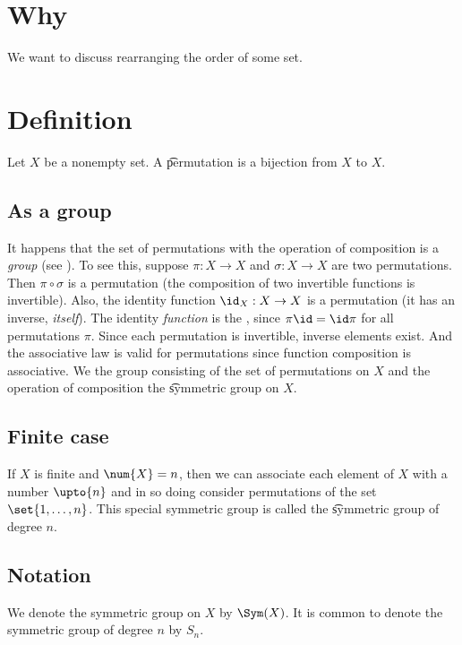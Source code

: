 
\section*{Why}

We want to discuss rearranging the order of some set.

\section*{Definition}

Let $X$ be a nonempty set.
A \t{permutation} is a bijection from $X$ to $X$.

\subsection*{As a group}

It happens that the set of permutations with the operation of composition is a \textit{group} (see ).
To see this, suppose $\pi : X \to X$ and $\sigma : X \to X$ are two permutations.
Then $\pi  \circ \sigma $ is a permutation (the composition of two invertible functions is invertible).
Also, the identity function $\id_{X}: X \to X$ is a permutation (it has an inverse, \textit{itself}).
The identity \textit{function} is the , since $\pi \id = \id\pi $ for all permutations $\pi $.
Since each permutation is invertible, inverse elements exist.
And the associative law is valid for permutations since function composition is associative.
We the group consisting of the set of permutations on $X$ and the operation of composition the \t{symmetric group on $X$}.

\subsection*{Finite case}

If $X$ is finite and $\num{X} = n$, then we can associate each element of $X$ with a number $\upto{n}$ and in so doing consider permutations of the set $\set{1, \dots , n}$.
This special symmetric group is called the \t{symmetric group of degree $n$}.

\subsection*{Notation}

We denote the symmetric group on $X$ by $\Sym(X)$.
It is common to denote the symmetric group of degree $n$ by $S_n$.

\blankpage
